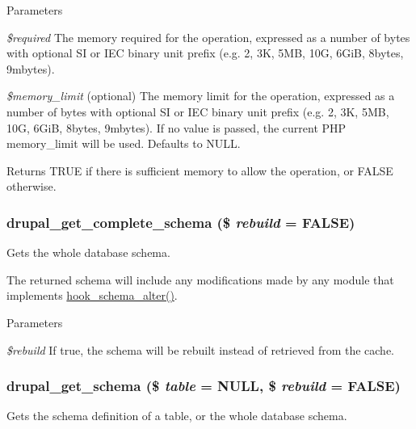\begin{DoxyParams}{Parameters}
\item[{\em \$required}]The memory required for the operation, expressed as a number of bytes with optional SI or IEC binary unit prefix (e.g. 2, 3K, 5MB, 10G, 6GiB, 8bytes, 9mbytes). \item[{\em \$memory\_\-limit}](optional) The memory limit for the operation, expressed as a number of bytes with optional SI or IEC binary unit prefix (e.g. 2, 3K, 5MB, 10G, 6GiB, 8bytes, 9mbytes). If no value is passed, the current PHP memory\_\-limit will be used. Defaults to NULL.\end{DoxyParams}
\begin{DoxyReturn}{Returns}
TRUE if there is sufficient memory to allow the operation, or FALSE otherwise. 
\end{DoxyReturn}
\hypertarget{group__schemaapi_ga31cee7d4c13fafc15c69304f16e34686}{
\subsubsection[{drupal\_\-get\_\-complete\_\-schema}]{\setlength{\rightskip}{0pt plus 5cm}drupal\_\-get\_\-complete\_\-schema (\$ {\em rebuild} = {\ttfamily FALSE})}}
\label{group__schemaapi_ga31cee7d4c13fafc15c69304f16e34686}
Gets the whole database schema.

The returned schema will include any modifications made by any module that implements \hyperlink{group__schemaapi_ga4a00aaeabd6903f707d8385476b9ae2a}{hook\_\-schema\_\-alter()}.


\begin{DoxyParams}{Parameters}
\item[{\em \$rebuild}]If true, the schema will be rebuilt instead of retrieved from the cache. \end{DoxyParams}
\hypertarget{group__schemaapi_ga979670bd6bd2e34337ffc5f0810f2d71}{
\subsubsection[{drupal\_\-get\_\-schema}]{\setlength{\rightskip}{0pt plus 5cm}drupal\_\-get\_\-schema (\$ {\em table} = {\ttfamily NULL}, \/  \$ {\em rebuild} = {\ttfamily FALSE})}}
\label{group__schemaapi_ga979670bd6bd2e34337ffc5f0810f2d71}
Gets the schema definition of a table, or the whole database schema.

